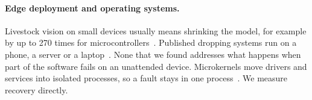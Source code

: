 \paragraph{Edge deployment and operating systems.} Livestock vision on small devices usually means shrinking the
model, for example by up to 270 times for microcontrollers~\cite{zhang2026tinyml}. Published dropping systems run on a
phone, a server or a laptop~\cite{degu2023,sakib2026,dhungana2025}. None that we found addresses what happens when part
of the software fails on an unattended device. Microkernels move drivers and services into isolated processes, so a
fault stays in one process~\cite{klein2009sel4,qnx8sysarch}. We measure recovery directly.
